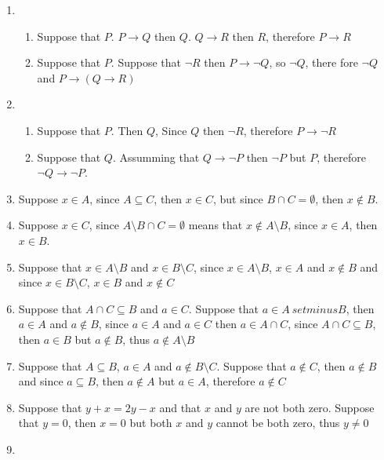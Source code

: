 \begin{enumerate}
    \item
    \begin{enumerate}
        \item 
        Suppose that $P$. $P \rightarrow Q$ then $Q$. $Q \rightarrow R$ then $R$, therefore $P \rightarrow R$
        \item
        Suppose that $P$. Suppose that $\lnot R$ then $P \rightarrow \lnot Q$, so $\lnot Q$, there fore $\lnot Q$ and $P \rightarrow (Q \rightarrow R)$
    \end{enumerate}
    \item
    \begin{enumerate}
        \item 
        Suppose that $P$. Then $Q$, Since $Q$ then $\lnot R$, therefore $P \rightarrow \lnot R$
        \item 
        Suppose that $Q$. Assumming that $Q \rightarrow \lnot P$ then $\lnot P$ but $P$, therefore $\lnot Q \rightarrow \lnot P$.
    \end{enumerate}
    \item
    Suppose $x \in A$, since $A \subseteq C$, then $x \in C$, but since $B \cap C = \emptyset$, then $x \notin B$.
    \item 
    Suppose $x \in C$, since $A \setminus B \cap C = \emptyset$ means that $x \notin A \setminus B$, since $x \in A$, then $x \in B$.
    \item 
    Suppose that $x \in A \setminus B$ and $x \in B \setminus C$, since $x \in A \setminus B$, $x \in A$ and $x \notin B$ and since $x \in B \setminus C$, $x \in B$ and $x \notin C$
    \item 
    Suppose that $A \cap C \subseteq B$ and $a \in C$. Suppose that $a \in A\ setminus B$, then $a \in A$ and $a \notin B$, since $a \in A$ and $a \in C$ then $a \in A \cap C$, since $A \cap C \subseteq B$, then $a \in B$ but $a \notin B$, thus $a \notin A \setminus B$
    \item 
    Suppose that $A \subseteq B$, $a \in A$ and $a \notin B \setminus C$. Suppose that $a \notin C$, then $a \notin B$ and since $a \subseteq B$, then $a \notin A$ but $a \in A$, therefore $a \notin C$
    \item 
    Suppose that $y + x = 2y - x$ and that $x$ and $y$ are not both zero. Suppose that $y = 0$, then $x = 0$ but both $x$ and $y$ cannot be both zero, thus $y \not = 0$
    \item 

\end{enumerate}
